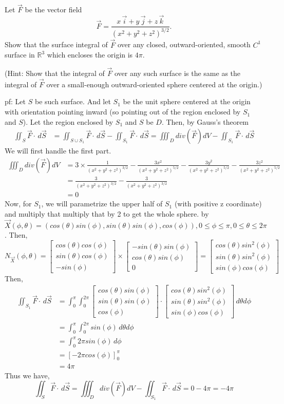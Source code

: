 \documentclass[11pt,letterpaper,cm]{nupset}
\newcommand{\bmat}[1]{\begin{bmatrix} #1 \end{bmatrix}}
\begin{document}
\begin{problem}[Exercise 9] Let $\vec{F}$ be the vector field
	$$\vec{F} = \frac{x\,\vec{i}+y\,\vec{j}+z\,\vec{k}}{(x^2+y^2+z^2)^{3/2}}.$$
	Show that the surface integral of $\vec{F}$ over any closed, outward-oriented, smooth $C^1$ surface in $\mathbb{R}^3$ which encloses the origin is $4\pi$. 
	\medskip
	
	(Hint: Show that the integral of $\vec{F}$ over any such surface is the same as the integral of $\vec{F}$ over a small-enough outward-oriented sphere centered at the origin.)
\end{problem}
\begin{solution}
	pf: Let $S$ be such surface. And let $S_1$ be the unit sphere centered at the origin with orientation pointing inward (so pointing out of the region enclosed by $S_1$ and $S$). Let the region enclosed by $S_1$ and $S$ be $D$. Then, by Gauss's theorem
	\begin{align*}
		\iint_S \vec{F}\cdot\,d\vec{S}&=\iint_{S\cup S_1} \vec{F}\cdot\,d\vec{S}-\iint_{S_1} \vec{F}\cdot\,d\vec{S}
		=\iiint_D div(\vec{F})dV-\iint_{S_1} \vec{F}\cdot\,d\vec{S}
	\end{align*}
	We will first handle the first part.
	\begin{align*}
		\iiint_D div(\vec{F})dV&=3\times\frac{1}{(x^2+y^2+z^2)^{3/2}}-\frac{3x^2}{(x^2+y^2+z^2)^{5/2}}-\frac{3y^2}{(x^2+y^2+z^2)^{5/2}}-\frac{3z^2}{(x^2+y^2+z^2)^{5/2}}\\
		&=\frac{3}{(x^2+y^2+z^2)^{3/2}}-\frac{3}{(x^2+y^2+z^2)^{3/2}}\\
		&=0
	\end{align*}
	Now, for $S_1$, we will parametrize the upper half of $S_1$ (with positive z coordinate) and multiply that multiply that by 2 to get the whole sphere. by $\vec{X}(\phi,\theta)=(cos(\theta)sin(\phi),sin(\theta)sin(\phi),cos(\phi)),0\leq\phi\leq \pi,0\leq\theta\leq 2\pi$. Then,
	$$N_{\vec{X}}(\phi,\theta)=\bmat{cos(\theta)cos(\phi)\\sin(\theta)cos(\phi)\\-sin(\phi)}\times \bmat{-sin(\theta)sin(\phi)\\cos(\theta)sin(\phi)\\0}=\bmat{cos(\theta)sin^2(\phi)\\sin(\theta)sin^2(\phi)\\sin(\phi)cos(\phi)}$$
	Then,
	\begin{align*}
		\iint_{S_1} \vec{F}\cdot\,d\vec{S}&=\int_0^{\pi}\int_0^{2\pi}\bmat{cos(\theta)sin(\phi)\\sin(\theta)sin(\phi)\\cos(\phi)}\cdot\bmat{cos(\theta)sin^2(\phi)\\sin(\theta)sin^2(\phi)\\sin(\phi)cos(\phi)}\,d\theta d\phi\\
		&=\int_0^{\pi}\int_0^{2\pi} sin(\phi)\,d\theta d\phi\\
		&=\int_0^{\pi} 2\pi sin(\phi)\, d\phi\\
		&=[-2\pi cos(\phi)]_0^{\pi}\\
		&=4\pi
	\end{align*}
	Thus we have,
	$$\iint_S \vec{F}\cdot\,d\vec{S}=\iiint_D div(\vec{F})dV-\iint_{S_1} \vec{F}\cdot\,d\vec{S}=0-4\pi=-4\pi$$
\end{solution}
\end{document}

